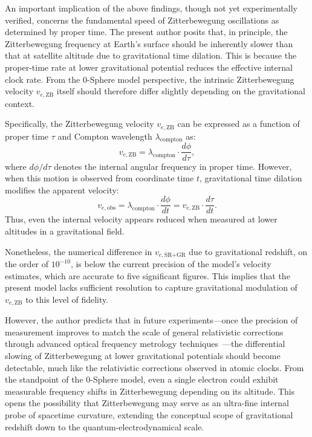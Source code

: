 \documentclass[%
 reprint,
 amsmath,amssymb,
 aps,
]{revtex4-1}
\numberwithin{equation}{section}%
\begin{document}
An important implication of the above findings, though not yet experimentally verified, concerns the fundamental speed of Zitterbewegung oscillations as determined by proper time. The present author posits that, in principle, the Zitterbewegung frequency at Earth's surface should be inherently slower than that at satellite altitude due to gravitational time dilation. This is because the proper-time rate at lower gravitational potential reduces the effective internal clock rate. From the 0-Sphere model perspective, the intrinsic Zitterbewegung velocity $v_{e,\text{ZB}}$ itself should therefore differ slightly depending on the gravitational context.

Specifically, the Zitterbewegung velocity $v_{e,\text{ZB}}$ can be expressed as a function of proper time $\tau$ and Compton wavelength $\lambda_{\text{compton}}$ as:
\begin{equation}
v_{e,\text{ZB}} = \lambda_{\text{compton}} \cdot \frac{d\phi}{d\tau},
\end{equation}
where $d\phi/d\tau$ denotes the internal angular frequency in proper time. However, when this motion is observed from coordinate time $t$, gravitational time dilation modifies the apparent velocity:
\begin{equation}
v_{e,\text{obs}} = \lambda_{\text{compton}} \cdot \frac{d\phi}{dt} = v_{e,\text{ZB}} \cdot \frac{d\tau}{dt}.
\end{equation}
Thus, even the internal velocity appears reduced when measured at lower altitudes in a gravitational field.

Nonetheless, the numerical difference in $v_{e,\text{SR+GR}}$ due to gravitational redshift, on the order of $10^{-10}$, is below the current precision of the model's velocity estimates, which are accurate to five significant figures. This implies that the present model lacks sufficient resolution to capture gravitational modulation of $v_{e,\text{ZB}}$ to this level of fidelity. 

However, the author predicts that in future experiments—once the precision of measurement improves to match the scale of general relativistic corrections through advanced optical frequency metrology techniques~\cite{udem2002}—the differential slowing of Zitterbewegung at lower gravitational potentials should become detectable, much like the relativistic corrections observed in atomic clocks. From the standpoint of the 0-Sphere model, even a single electron could exhibit measurable frequency shifts in Zitterbewegung depending on its altitude. This opens the possibility that Zitterbewegung may serve as an ultra-fine internal probe of spacetime curvature, extending the conceptual scope of gravitational redshift down to the quantum-electrodynamical scale.
\end{document}
